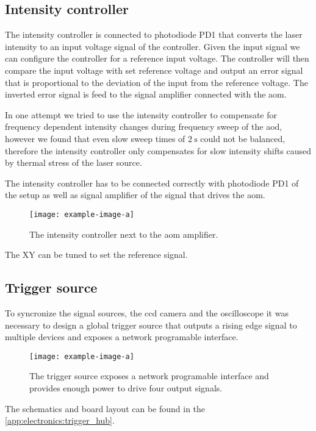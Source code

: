 \subsection{Intensity controller}

The intensity controller is connected to photodiode PD1 that converts the
laser intensity to an input voltage signal of the controller. Given the
input signal we can configure the controller for a reference input voltage.
The controller will then compare the input voltage with set reference voltage
and output an error signal that is proportional to the deviation of the
input from the reference voltage. The inverted error signal is feed to the
signal amplifier connected with the \gls{aom}.

In one attempt we tried to use the intensity controller to compensate for
frequency dependent intensity changes during frequency sweep of the \gls{aod},
however we found that even slow sweep times of $\SI{2}{\second}$ could not
be balanced, therefore the intensity controller only compensates for slow
intensity shifts caused by thermal stress of the laser source.

The intensity controller has to be connected correctly with photodiode PD1
of the setup as well as signal amplifier of the signal that drives the
\gls{aom}.

\begin{figure}[h]
  \centering
  \texttt{[image: example-image-a]}
  \caption{The intensity controller next to the \gls{aom} amplifier.}
  \label{fig:intcontrol}
\end{figure}

The XY can be tuned to set the reference signal.

\subsection{Trigger source}

To syncronize the signal sources, the \gls{ccd} camera and the oscilloscope
it was necessary to design a global trigger source that outputs a rising edge
signal to multiple devices and exposes a network programable interface.

\begin{figure}[h]
  \centering
  \texttt{[image: example-image-a]}
  \caption{The trigger source exposes a network programable interface and
  provides enough power to drive four output signals.}
  \label{fig:elec:trig}
\end{figure}
The schematics and board layout can be found in the
\cref{app:electronics:trigger_hub}.
